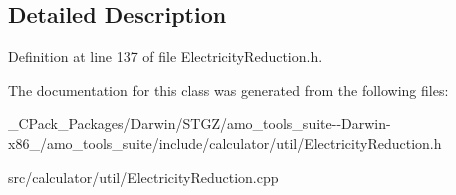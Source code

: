 \subsection{Detailed Description}


Definition at line 137 of file Electricity\+Reduction.\+h.



The documentation for this class was generated from the following files\+:\begin{DoxyCompactItemize}
\item 
\+\_\+\+C\+Pack\+\_\+\+Packages/\+Darwin/\+S\+T\+G\+Z/amo\+\_\+tools\+\_\+suite-\/-\/\+Darwin-\/x86\+\_/amo\+\_\+tools\+\_\+suite/include/calculator/util/Electricity\+Reduction.\+h\item 
src/calculator/util/Electricity\+Reduction.\+cpp\end{DoxyCompactItemize}
